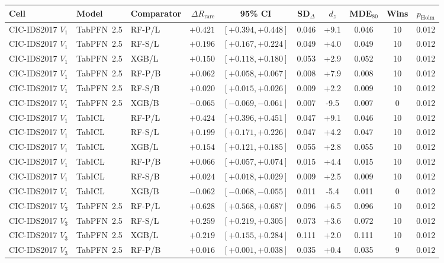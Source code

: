 \begin{tabular}{@{}lllrcccccc@{}}
\toprule
Cell & Model & Comparator & $\Delta R_{\mathrm{rare}}$ & 95\% CI & SD$_\Delta$ & $d_z$ & MDE$_{80}$ & Wins & $p_{\mathrm{Holm}}$ \\
\midrule
CIC-IDS2017 $V_1$ & TabPFN~2.5 & RF-P/L & $+0.421$ & $[+0.394,+0.448]$ & 0.046 & +9.1 & 0.046 & 10 & 0.012 \\
CIC-IDS2017 $V_1$ & TabPFN~2.5 & RF-S/L & $+0.196$ & $[+0.167,+0.224]$ & 0.049 & +4.0 & 0.049 & 10 & 0.012 \\
CIC-IDS2017 $V_1$ & TabPFN~2.5 & XGB/L & $+0.150$ & $[+0.118,+0.180]$ & 0.053 & +2.9 & 0.052 & 10 & 0.012 \\
CIC-IDS2017 $V_1$ & TabPFN~2.5 & RF-P/B & $+0.062$ & $[+0.058,+0.067]$ & 0.008 & +7.9 & 0.008 & 10 & 0.012 \\
CIC-IDS2017 $V_1$ & TabPFN~2.5 & RF-S/B & $+0.020$ & $[+0.015,+0.026]$ & 0.009 & +2.2 & 0.009 & 10 & 0.012 \\
CIC-IDS2017 $V_1$ & TabPFN~2.5 & XGB/B & $-0.065$ & $[-0.069,-0.061]$ & 0.007 & -9.5 & 0.007 & 0 & 0.012 \\
CIC-IDS2017 $V_1$ & TabICL & RF-P/L & $+0.424$ & $[+0.396,+0.451]$ & 0.047 & +9.1 & 0.046 & 10 & 0.012 \\
CIC-IDS2017 $V_1$ & TabICL & RF-S/L & $+0.199$ & $[+0.171,+0.226]$ & 0.047 & +4.2 & 0.047 & 10 & 0.012 \\
CIC-IDS2017 $V_1$ & TabICL & XGB/L & $+0.154$ & $[+0.121,+0.185]$ & 0.055 & +2.8 & 0.055 & 10 & 0.012 \\
CIC-IDS2017 $V_1$ & TabICL & RF-P/B & $+0.066$ & $[+0.057,+0.074]$ & 0.015 & +4.4 & 0.015 & 10 & 0.012 \\
CIC-IDS2017 $V_1$ & TabICL & RF-S/B & $+0.024$ & $[+0.018,+0.029]$ & 0.009 & +2.5 & 0.009 & 10 & 0.012 \\
CIC-IDS2017 $V_1$ & TabICL & XGB/B & $-0.062$ & $[-0.068,-0.055]$ & 0.011 & -5.4 & 0.011 & 0 & 0.012 \\
CIC-IDS2017 $V_3$ & TabPFN~2.5 & RF-P/L & $+0.628$ & $[+0.568,+0.687]$ & 0.096 & +6.5 & 0.096 & 10 & 0.012 \\
CIC-IDS2017 $V_3$ & TabPFN~2.5 & RF-S/L & $+0.259$ & $[+0.219,+0.305]$ & 0.073 & +3.6 & 0.072 & 10 & 0.012 \\
CIC-IDS2017 $V_3$ & TabPFN~2.5 & XGB/L & $+0.219$ & $[+0.155,+0.284]$ & 0.111 & +2.0 & 0.111 & 10 & 0.012 \\
CIC-IDS2017 $V_3$ & TabPFN~2.5 & RF-P/B & $+0.016$ & $[+0.001,+0.038]$ & 0.035 & +0.4 & 0.035 & 9 & 0.012 \\

\end{tabular}
